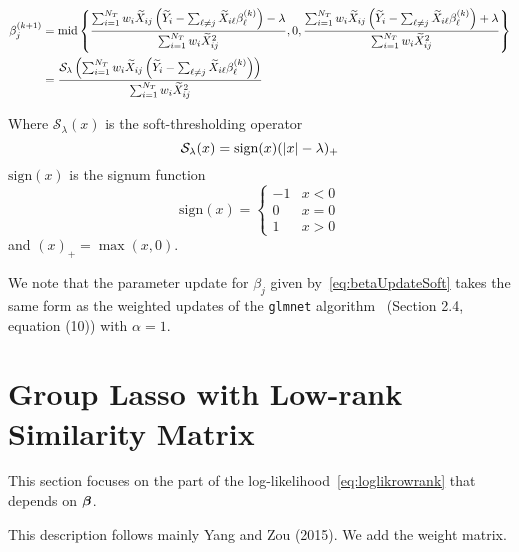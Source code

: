 \begin{align}
\beta_j^{(k+1)} & = \textrm{{mid}}\left\lbrace \frac{  \sum_{i=1}^{N_T} w_i \widetilde{X}_{ij}\left(  \widetilde{Y}_i - \sum_{\ell \neq j}\widetilde{X}_{i\ell} \beta_\ell^{(k)} \right) - \lambda}{\sum_{i=1}^{N_T} w_i \widetilde{X}_{ij}^2}, 0,\frac{  \sum_{i=1}^{N_T} w_i \widetilde{X}_{ij}\left(  \widetilde{Y}_i - \sum_{\ell \neq j}\widetilde{X}_{i\ell} \beta_\ell^{(k)} \right) + \lambda}{\sum_{i=1}^{N_T} w_i \widetilde{X}_{ij}^2} \right\rbrace \nonumber \\
& = \frac{\mathcal{S}_{\lambda}\left( \sum_{i=1}^{N_T} w_i \widetilde{X}_{ij}\left(  \widetilde{Y}_i - \sum_{\ell \neq j}\widetilde{X}_{i\ell} \beta_\ell^{(k)} \right)\right) }{\sum_{i=1}^{N_T} w_i \widetilde{X}_{ij}^2} \label{eq:betaUpdateSoft}
\end{align}

Where $\mathcal{S}_{\lambda}(x)$ is the soft-thresholding operator
\begin{equation*}
\mathcal{S}_{\lambda}(x) = \textrm{{sign}}(x)(|x| - \lambda)_+
\end{equation*}
$\textrm{sign}(x)$ is the signum function
\begin{equation*}
\textrm{sign}(x) = \begin{cases}
-1 & x<0\\
0 & x= 0\\
1 & x>0
\end{cases}
\end{equation*}
and $(x)_+ = \max(x, 0)$.

We note that the parameter update for $\beta_j$ given by~\eqref{eq:betaUpdateSoft} takes the same form as the weighted updates of the \texttt{glmnet} algorithm~\citep{friedman2010regularization} (Section 2.4, equation (10)) with $\alpha=1$.



\section{Group Lasso with Low-rank Similarity Matrix}
This section focuses on the part of the log-likelihood~\eqref{eq:loglikrowrank} that depends on $\boldsymbol{\beta}$.

This description follows mainly Yang and Zou (2015). We add the weight matrix.

